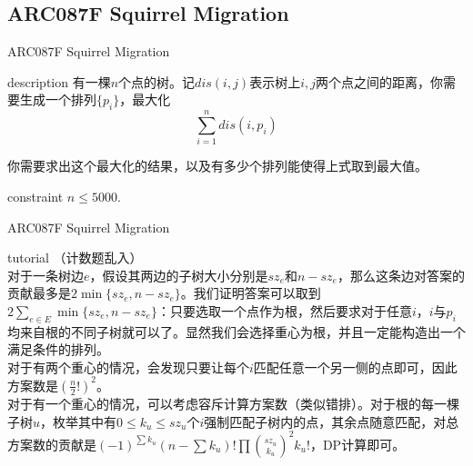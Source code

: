 \documentclass{beamer}
\begin{document}
\subsection{ARC087F Squirrel Migration}
\begin{frame}{ARC087F Squirrel Migration}
	\begin{block}{description}
		有一棵$n$个点的树。记$dis(i, j)$表示树上$i, j$两个点之间的距离，你需要生成一个排列$\{p_i\}$，最大化$$\sum_{i=1}^ndis(i, p_i)$$
		
		你需要求出这个最大化的结果，以及有多少个排列能使得上式取到最大值。
	\end{block}
	\begin{block}{constraint}
		$n \le 5000.$
	\end{block}
\end{frame}
\begin{frame}{ARC087F Squirrel Migration}
	\begin{block}{tutorial}
		（计数题乱入）\\
		
		对于一条树边$e$，假设其两边的子树大小分别是$sz_e$和$n - sz_e$，那么这条边对答案的贡献最多是$2\min\{sz_e, n - sz_e\}$。我们证明答案可以取到$2\sum_{e \in E}\min\{sz_e, n - sz_e\}$：只要选取一个点作为根，然后要求对于任意$i$，$i$与$p_i$均来自根的不同子树就可以了。显然我们会选择重心为根，并且一定能构造出一个满足条件的排列。\\
		
		对于有两个重心的情况，会发现只要让每个$i$匹配任意一个另一侧的点即可，因此方案数是$(\frac n2 !)^2$。\\
		
		对于有一个重心的情况，可以考虑容斥计算方案数（类似错排）。对于根的每一棵子树$u$，枚举其中有$0 \le k_u \le sz_u$个$i$强制匹配子树内的点，其余点随意匹配，对总方案数的贡献是$(-1)^{\sum k_u}(n-\sum k_u)!\prod \binom{sz_u}{k_u}^2k_u!$，DP计算即可。
	\end{block}
\end{frame}
\end{document}
